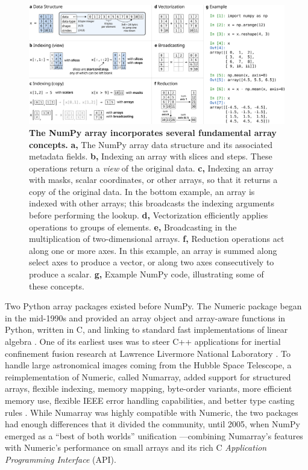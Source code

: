 \documentclass[twocolumn]{article}
\begin{document}
\begin{figure}[h]
  \centering
  \includegraphics[width=\textwidth]{concepts}
  \caption{\textbf{The NumPy array incorporates several fundamental array concepts.}
    \textbf{a,} The NumPy array data structure and its associated metadata fields.
    \textbf{b,} Indexing an array with slices and steps. These
  operations return a \emph{view} of the original data.
    \textbf{c,} Indexing an array with masks, scalar coordinates, or
  other arrays, so that it returns a copy of the original data. In the
  bottom example, an array is indexed with other arrays; this broadcasts the indexing arguments before performing the lookup.
    \textbf{d,} Vectorization efficiently applies operations to groups
  of elements.
    \textbf{e,} Broadcasting in the multiplication of two-dimensional arrays.
    \textbf{f,} Reduction operations act along one or more axes. In this
    example, an array is summed along select axes to produce a vector, or along two axes consecutively to
    produce a scalar.
    \textbf{g,} Example NumPy code, illustrating some of these concepts.
   }
  \label{fig:array-concepts}
\end{figure}

Two Python array packages existed before NumPy.
The Numeric package began in the mid-1990s and provided an array object and array-aware functions
in Python, written in C, and linking to standard fast implementations of linear
algebra \cite{dubois1996numerical,Numericmanual}.
One of its earliest uses was to steer C++ applications for
inertial confinement fusion research at
Lawrence Livermore National Laboratory \cite{yang1997steering}.
To handle large astronomical images coming from the Hubble Space Telescope,
a reimplementation of Numeric, called Numarray, added
support for structured arrays, flexible indexing, memory mapping, byte-order variants,
more efficient memory use, flexible IEEE error handling capabilities, and
better type casting rules \cite{greenfield2003numarray}.
While Numarray was highly compatible with Numeric, the two packages had enough
differences that it divided the community, until 2005, when NumPy emerged as a
``best of both worlds'' unification \cite{oliphant2006guide}---combining
Numarray's features with Numeric's performance on small arrays and its rich C
\emph{Application Programming Interface} (API).
\end{document}
